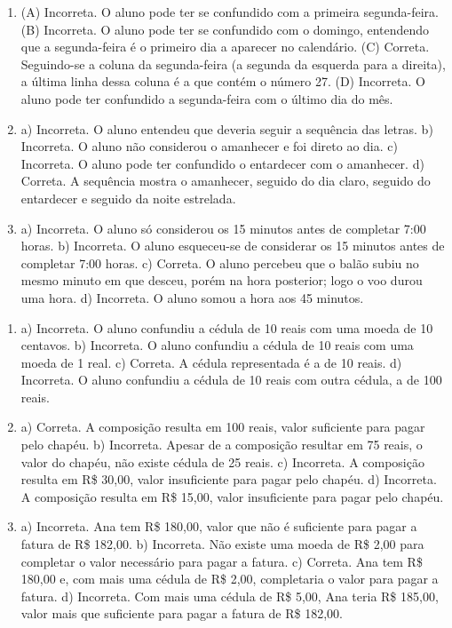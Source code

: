 
\begin{enumerate}
\item
(A) Incorreta. O aluno pode ter se confundido com a primeira segunda-feira.
(B) Incorreta. O aluno pode ter se confundido com o domingo, entendendo que
a segunda-feira é o primeiro dia a aparecer no calendário.
(C) Correta. Seguindo-se a coluna da segunda-feira (a segunda da esquerda para a direita), a última linha dessa coluna é a que contém o número 27.
(D) Incorreta. O aluno pode ter confundido a segunda-feira com o último
dia do mês.

\item
a) Incorreta. O aluno entendeu que deveria seguir a sequência das letras.
b) Incorreta. O aluno não considerou o amanhecer e foi direto ao dia.
c) Incorreta. O aluno pode ter confundido o entardecer com o amanhecer.
d) Correta. A sequência mostra o amanhecer, seguido do dia claro, seguido
do entardecer e seguido da noite estrelada.

\item
a) Incorreta. O aluno só considerou os 15 minutos antes de
completar 7:00 horas.
b) Incorreta. O aluno esqueceu-se de considerar os 15 minutos antes de
completar 7:00 horas.
c) Correta. O aluno percebeu que o balão subiu no mesmo minuto em
que desceu, porém na hora posterior; logo o voo durou uma hora.
d) Incorreta. O aluno somou a hora aos 45 minutos.
\end{enumerate}


\begin{enumerate}
\item
a) Incorreta. O aluno confundiu a cédula de 10 reais com uma moeda de 10 centavos.
b) Incorreta. O aluno confundiu a cédula de 10 reais com uma moeda de 1 real.
c) Correta. A cédula representada é a de 10 reais.
d) Incorreta. O aluno confundiu a cédula de 10 reais com outra cédula, a de 100 reais.

\item
a) Correta. A composição resulta em 100 reais, valor suficiente para pagar pelo chapéu.
b) Incorreta. Apesar de a composição resultar em 75 reais, o valor do chapéu, não existe cédula de 25 reais.
c) Incorreta. A composição resulta em R\$ 30,00, valor insuficiente para pagar pelo chapéu.
d) Incorreta. A composição resulta em R\$ 15,00, valor insuficiente para pagar pelo chapéu.

\item
a) Incorreta. Ana tem R\$ 180,00, valor que não é suficiente para pagar a fatura de R\$ 182,00.
b) Incorreta. Não existe uma moeda de R\$ 2,00 para completar o valor necessário para pagar a fatura.
c) Correta. Ana tem R\$ 180,00 e, com mais uma cédula de R\$ 2,00, completaria o valor para pagar a fatura.
d) Incorreta. Com mais uma cédula de R\$ 5,00, Ana teria R\$ 185,00, valor mais que suficiente para pagar a fatura de R\$ 182,00.
\end{enumerate}

